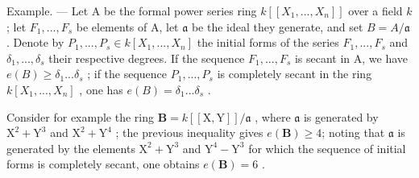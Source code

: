 Example. --- Let A be the formal power series ring \(k[[X_1, ..., X_n]]\) over a field \(k\); let \(F_1, ..., F_s\) be elements of A, let \(\mathfrak{a}\) be the ideal they generate, and set \(B = A/\mathfrak{a}\). Denote by \(P_1, ..., P_s \in k[X_1, ..., X_n]\) the initial forms of the series \(F_1, ..., F_s\) and \(\delta_1, ..., \delta_s\) their respective degrees. If the sequence \(F_1, ..., F_s\) is secant in A, we have \(e(B) \geqslant \delta_1 ... \delta_s\) ; if the sequence \(P_1, ..., P_s\) is completely secant in the ring \(k[X_1, ..., X_n]\) , one has \(e(B) = \delta_1 ... \delta_s\) .

Consider for example the ring \(\mathbf{B} = k[[\mathrm{X},\mathrm{Y}]] / \mathfrak{a}\) , where \(\mathfrak{a}\) is generated by \(\mathrm{X}^2 + \mathrm{Y}^3\) and \(\mathrm{X}^2 + \mathrm{Y}^4\) ; the previous inequality gives \(e(\mathbf{B})\geqslant 4\); noting that \(\mathfrak{a}\) is generated by the elements \(\mathrm{X}^2 + \mathrm{Y}^3\) and \(\mathrm{Y}^4 -\mathrm{Y}^3\) for which the sequence of initial forms is completely secant, one obtains \(e(\mathbf{B}) = 6\) .

